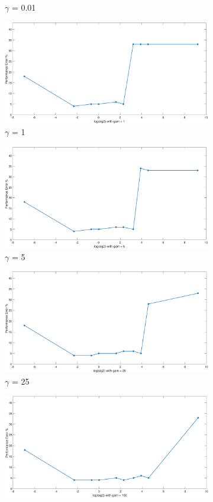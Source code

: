 {\begin{figure}[!htbp]
\begin{floatrow}
{\begin{subfigure}{.3\textwidth}
				\caption{$\gamma$ = 0.01}
				\label{fig:loo_gamma(0.01)}
			\end{subfigure}%
			\begin{subfigure}{.3\textwidth}
				\includegraphics[height=0.35\linewidth,width=0.7\linewidth]{Exercise1/Report/Ex1.3_loo_gam(1).eps}
				\caption{$\gamma$ = 1}
				\label{fig:loo_gamma(1))}
			\end{subfigure}
			\begin{subfigure}{.3\textwidth}
				\includegraphics[height=0.35\linewidth,width=0.7\linewidth]{Exercise1/Report/Ex1.3_loo_gam(5).eps}
				\caption{$\gamma$ = 5}
				\label{fig:loo_gamma(5)}
			\end{subfigure}%
			\begin{subfigure}{.3\textwidth}
				\includegraphics[height=0.35\linewidth,width=0.7\linewidth]{Exercise1/Report/Ex1.3_loo_gam(25).eps}
				\caption{$\gamma$ = 25}
				\label{fig:loo_gamma(25)}
			\end{subfigure}
			\begin{subfigure}{.3\textwidth}
				\includegraphics[height=0.35\linewidth,width=0.7\linewidth]{Exercise1/Report/Ex1.3_loo_gam(100).eps}

\end{subfigure}}
\end{floatrow}
\end{figure}}
